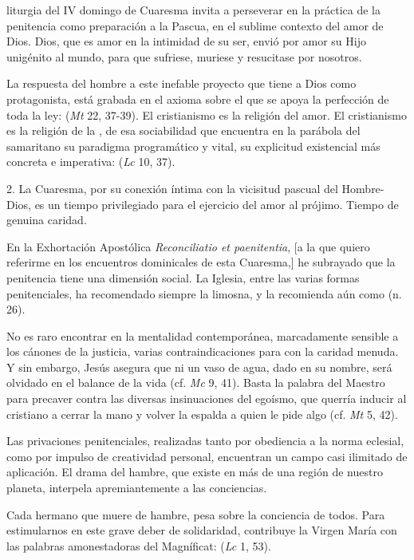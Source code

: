 \begin{body}
	 liturgia del IV domingo de Cuaresma invita a perseverar en la práctica de la penitencia como preparación a la Pascua, en el sublime contexto del amor de Dios. Dios, que es amor en la intimidad de su ser, envió por amor su Hijo unigénito al mundo, para que sufriese, muriese y resucitase por nosotros.
	
	La respuesta del hombre a este inefable proyecto que tiene a Dios como protagonista, está grabada en el axioma sobre el que se apoya la perfección de toda la ley:  (\textit{Mt} 22, 37-39). El cristianismo es la religión del amor. El cristianismo es la religión de la , de esa sociabilidad que encuentra en la parábola del samaritano su paradigma programático y vital, su explicitud existencial más concreta e imperativa:  (\textit{Lc} 10, 37).
	
	2. La Cuaresma, por su conexión íntima con la vicisitud pascual del Hombre-Dios, es un tiempo privilegiado para el ejercicio del amor al prójimo. Tiempo de genuina caridad.
	
	En la Exhortación Apostólica \textit{Reconciliatio et paenitentia}, [a la que quiero referirme en los encuentros dominicales de esta Cuaresma,] he subrayado que la penitencia tiene una dimensión social. La Iglesia, entre las varias formas penitenciales, ha recomendado siempre la limosna, y la recomienda aún como  (n. 26).
	
	No es raro encontrar en la mentalidad contemporánea, marcadamente sensible a los cánones de la justicia, varias contraindicaciones para con la caridad menuda. Y sin embargo, Jesús asegura que ni un vaso de agua, dado en su nombre, será olvidado en el balance de la vida (cf. \textit{Mc} 9, 41). Basta la palabra del Maestro para precaver contra las diversas insinuaciones del egoísmo, que querría inducir al cristiano a cerrar la mano y volver la espalda a quien le pide algo (cf. \textit{Mt} 5, 42).
	
	Las privaciones penitenciales, realizadas tanto por obediencia a la norma eclesial, como por impulso de creatividad personal, encuentran un campo casi ilimitado de aplicación. El drama del hambre, que existe en más de una región de nuestro planeta, interpela apremiantemente a las conciencias.
	
	Cada hermano que muere de hambre, pesa sobre la conciencia de todos. Para estimularnos en este grave deber de solidaridad, contribuye la Virgen María con las palabras amonestadoras del Magníficat:  (\textit{Lc} 1, 53).
\end{body}

